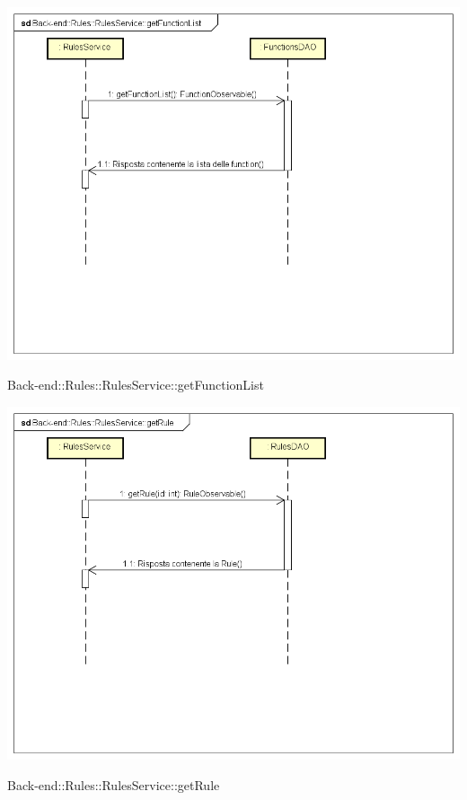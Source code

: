 \includegraphics[width=\textwidth,height=\textheight,keepaspectratio]{images/diagrams/back-end/Ufficial_Backend/Back-end__Rules__RulesService__getFunctionList.png} 	\caption{Back-end::Rules::RulesService::getFunctionList}
\includegraphics[width=\textwidth,height=\textheight,keepaspectratio]{images/diagrams/back-end/Ufficial_Backend/Back-end__Rules__RulesService__getRule.png} 	\caption{Back-end::Rules::RulesService::getRule}
